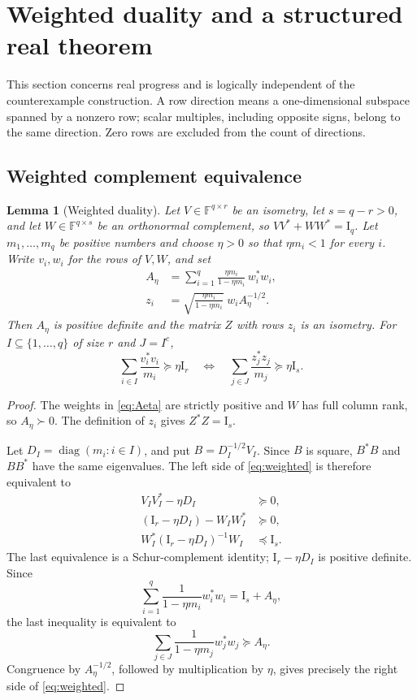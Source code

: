 \documentclass[11pt,letterpaper]{article}
\newtheorem{lemma}[theorem]{Lemma}
\theoremstyle{definition}
\theoremstyle{remark}
\newcommand{\F}{\mathbb F}
\newcommand{\Id}{\mathrm I}
\newcommand{\diag}{\operatorname{diag}}
\begin{document}
\section{Weighted duality and a structured real theorem}

This section concerns real progress and is logically independent of the counterexample construction. A row direction means a one-dimensional subspace spanned by a nonzero row; scalar multiples, including opposite signs, belong to the same direction. Zero rows are excluded from the count of directions.

\subsection{Weighted complement equivalence}

\begin{lemma}[Weighted duality]\label{lem:weighted}
Let $V\in\F^{q\times r}$ be an isometry, let $s=q-r>0$, and let $W\in\F^{q\times s}$ be an orthonormal complement, so $VV^*+WW^*=\Id_q$. Let $m_1,\ldots,m_q$ be positive numbers and choose $\eta>0$ so that $\eta m_i<1$ for every $i$. Write $v_i,w_i$ for the rows of $V,W$, and set
\begin{align}
 A_\eta&=\sum_{i=1}^q\frac{\eta m_i}{1-\eta m_i}\,w_i^*w_i,\label{eq:Aeta}\\
 z_i&=\sqrt{\frac{\eta m_i}{1-\eta m_i}}\;w_iA_\eta^{-1/2}.\label{eq:z}
\end{align}
Then $A_\eta$ is positive definite and the matrix $Z$ with rows $z_i$ is an isometry. For $I\subseteq\{1,\ldots,q\}$ of size $r$ and $J=I^c$,
\begin{equation}
 \sum_{i\in I}\frac{v_i^*v_i}{m_i}\succeq\eta\Id_r
 \quad\Longleftrightarrow\quad
 \sum_{j\in J}\frac{z_j^*z_j}{m_j}\succeq\eta\Id_s.
 \label{eq:weighted}
\end{equation}
\end{lemma}
\begin{proof}
The weights in \eqref{eq:Aeta} are strictly positive and $W$ has full column rank, so $A_\eta\succ0$. The definition of $z_i$ gives $Z^*Z=\Id_s$.

Let $D_I=\diag(m_i:i\in I)$, and put $B=D_I^{-1/2}V_I$. Since $B$ is square, $B^*B$ and $BB^*$ have the same eigenvalues. The left side of \eqref{eq:weighted} is therefore equivalent to
\begin{align*}
 V_IV_I^*-\eta D_I&\succeq0,\\
 (\Id_r-\eta D_I)-W_IW_I^*&\succeq0,\\
 W_I^*(\Id_r-\eta D_I)^{-1}W_I&\preceq\Id_s.
\end{align*}
The last equivalence is a Schur-complement identity; $\Id_r-\eta D_I$ is positive definite. Since
\[
 \sum_{i=1}^q\frac1{1-\eta m_i}w_i^*w_i=\Id_s+A_\eta,
\]
the last inequality is equivalent to
\[
 \sum_{j\in J}\frac1{1-\eta m_j}w_j^*w_j\succeq A_\eta.
\]
Congruence by $A_\eta^{-1/2}$, followed by multiplication by $\eta$, gives precisely the right side of \eqref{eq:weighted}.
\end{proof}
\end{document}
